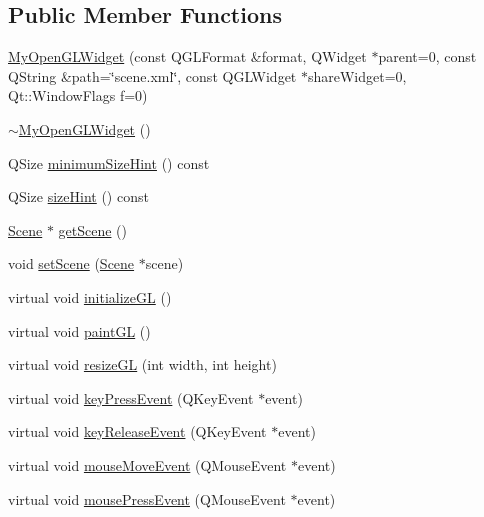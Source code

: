 \subsection*{Public Member Functions}
\begin{DoxyCompactItemize}
\item 
\hyperlink{class_my_open_g_l_widget_abdf77aa3e6d581bbcbbc505b4c592492}{My\+Open\+G\+L\+Widget} (const Q\+G\+L\+Format \&format, Q\+Widget $\ast$parent=0, const Q\+String \&path=\char`\"{}scene.\+xml\char`\"{}, const Q\+G\+L\+Widget $\ast$share\+Widget=0, Qt\+::\+Window\+Flags f=0)
\item 
\hyperlink{class_my_open_g_l_widget_aa9bdb4eb867d9e0bbfab210732fa5883}{$\sim$\+My\+Open\+G\+L\+Widget} ()
\item 
Q\+Size \hyperlink{class_my_open_g_l_widget_a4a037578f8e21a015e7b2915992fbe5d}{minimum\+Size\+Hint} () const 
\item 
Q\+Size \hyperlink{class_my_open_g_l_widget_abacca5d710f6a81b5edfd164f0148ed6}{size\+Hint} () const 
\item 
\hyperlink{class_scene}{Scene} $\ast$ \hyperlink{class_my_open_g_l_widget_ab25f238721b8e1cba36c2a0350ac57ba}{get\+Scene} ()
\item 
void \hyperlink{class_my_open_g_l_widget_aaac5737e9ce05a94006aa92afed5d403}{set\+Scene} (\hyperlink{class_scene}{Scene} $\ast$scene)
\item 
virtual void \hyperlink{class_my_open_g_l_widget_a98597f5669cec1c90f36c1d38569afc5}{initialize\+G\+L} ()
\item 
virtual void \hyperlink{class_my_open_g_l_widget_af7babfe769e968c317e646c4387b357d}{paint\+G\+L} ()
\item 
virtual void \hyperlink{class_my_open_g_l_widget_a51847d078dbd11fb99335abbc5eaf4fc}{resize\+G\+L} (int width, int height)
\item 
virtual void \hyperlink{class_my_open_g_l_widget_a87a479700547c066721b4b3532b040a2}{key\+Press\+Event} (Q\+Key\+Event $\ast$event)
\item 
virtual void \hyperlink{class_my_open_g_l_widget_a57e054ac1c21ed8585ca57b151ec6b38}{key\+Release\+Event} (Q\+Key\+Event $\ast$event)
\item 
virtual void \hyperlink{class_my_open_g_l_widget_a27abe02c04240317cf42c1cec1ac7e25}{mouse\+Move\+Event} (Q\+Mouse\+Event $\ast$event)
\item 
virtual void \hyperlink{class_my_open_g_l_widget_a6a2e229f91bb75775bb539c85bb696ef}{mouse\+Press\+Event} (Q\+Mouse\+Event $\ast$event)
\end{DoxyCompactItemize}
